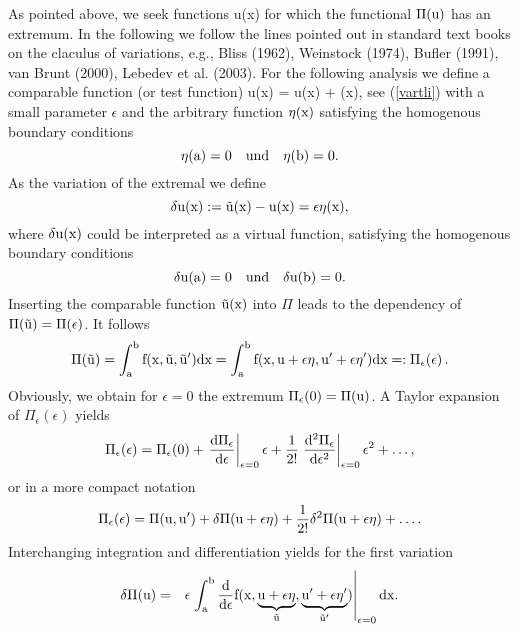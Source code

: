 As pointed above, we seek functions u(x) for which the functional $\rm \Pi(u)$
has an extremum. 
In the following we follow the lines pointed out in standard text books on 
the claculus of variations, e.g.,
Bliss (1962), Weinstock (1974), Bufler (1991), van Brunt (2000),
Lebedev et al. (2003).
For the following analysis we define a comparable function 
(or test function)
\ebn
\rm
\tilde u(x) = u(x) + \epsilon \eta(x),
\een
see (\ref{vartli}) with a small parameter $\epsilon$ and the arbitrary function $\rm \eta(x)$
satisfying the homogenous boundary conditions
\begin{equation}
\rm
\eta(a)=0 \quad \mbox{und} \quad \eta(b)=0 .
\label{bceta}
\end{equation}
As the variation of the extremal we define 
\begin{equation}
\rm
\delta u(x) := \tilde{u}(x) - u(x) = \epsilon \eta(x) ,
\label{eq:deltu}
\end{equation}
where $\rm \delta u(x)$ could be interpreted as a virtual function, satisfying
the homogenous boundary conditions
\begin{equation}
\rm
\delta u(a)=0 \quad \mbox{und} \quad \delta u(b)=0 .
\label{bcetadeltau}
\end{equation}
Inserting the comparable function $\rm \tilde u(x)$ into $\Pi$
leads to the dependency of $\rm \Pi(\tilde u)=\Pi(\epsilon)$. It follows 
\begin{equation}
\rm
\Pi(\tilde{u}) 
= \int_a^b f(x,\tilde{u},\tilde{u}') dx 
= \int_a^b f(x, u+\epsilon \eta, u' + \epsilon \eta') dx 
=: \Pi_{\epsilon}(\epsilon) \, .
\end{equation}
Obviously, we obtain for $\epsilon=0$ the extremum 
$\rm \Pi_{\epsilon}(0)=\Pi(u)$.
A Taylor expansion of $\Pi_{\epsilon}(\epsilon)$ yields
\begin{equation}
\rm
{\Pi_{\epsilon}}(\epsilon)
= {\Pi_{\epsilon}}(0)
+ \left. \frac{d {\Pi_{\epsilon}}}{d \epsilon} \right|_{\epsilon=0}
\epsilon 
+ \frac{1}{2!} \left. \frac{d^2 {\Pi_{\epsilon}}}{d \epsilon^2} 
\right|_{\epsilon=0}  \epsilon^2 
+ \dots ,
\end{equation}
or in a more compact notation
\begin{equation}
\rm
{\Pi_{\epsilon}}(\epsilon) = 
\Pi(u, u') 
+ \delta \Pi(u + \epsilon \eta) 
+ \frac{1}{2!} \delta^2 \Pi(u + \epsilon \eta) 
+ \dots .
\label{eq:piu}
\end{equation}
Interchanging integration and differentiation yields
for the first variation
\begin{eqnarray}
\rm 
\delta \Pi(u) & = &\rm  \epsilon \left. \int_a^b \frac{d}{d \epsilon} f(x, 
\underbrace{\rm u + \epsilon \eta}_{\rm \tilde{u}}, 
\underbrace{\rm u'+ \epsilon \eta'}_{\rm \tilde{u}'}) \right|_{\epsilon=0} dx. \end{eqnarray}
